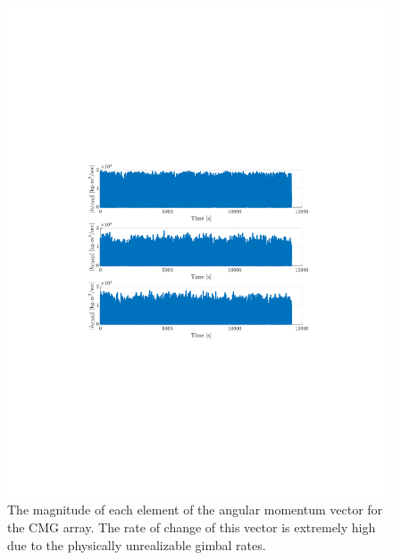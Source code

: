 \documentclass[]{article}
\begin{document}
\begin{figure}[!h]
	\centering
	\includegraphics[width=\linewidth,trim={4cm, 8cm, 4cm, 8cm},clip]{figs/P3Q4.pdf}
	\caption{The magnitude of each element of the angular momentum vector for the CMG array. The rate of change of this vector is extremely high due to the physically unrealizable gimbal rates.}
	\label{fig:P3Q4}
\end{figure}
\end{document}
